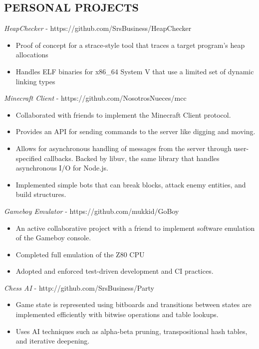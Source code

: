 \documentclass[overlapped, 10pt]{res} %
\begin{document}
\begin{resume}

\section{PERSONAL PROJECTS}
{\sl HeapChecker} - https://github.com/SrsBusiness/HeapChecker
\begin{itemize} \itemsep -2pt %
    \item Proof of concept for a strace-style tool that traces a target program's heap allocations
    \item Handles ELF binaries for x86\_64 System V that use a limited set of dynamic linking types
\end{itemize}
{\sl Minecraft Client} - https://github.com/NosotrosNueces/mcc
\begin{itemize} \itemsep -2pt %
    \item Collaborated with friends to implement the Minecraft Client protocol.
    \item Provides an API for sending commands to the server like digging and moving.
    \item Allows for asynchronous handling of messages from the server through user-specified callbacks. Backed by libuv, the same library that handles asynchronous I/O for Node.js.
    \item Implemented simple bots that can break blocks, attack enemy entities, and build structures.
\end{itemize}
{\sl Gameboy Emulator} - https://github.com/mukkid/GoBoy
\begin{itemize} \itemsep -2pt %
    \item An active collaborative project with a friend to implement software emulation of the Gameboy console.
    \item Completed full emulation of the Z80 CPU
    \item Adopted and enforced test-driven development and CI practices.
\end{itemize}
{\sl Chess AI} - http://github.com/SrsBusiness/Party
\begin{itemize} \itemsep -2pt %
    \item Game state is represented using bitboards and transitions between states are implemented efficiently with bitwise operations and table lookups.
    \item Uses AI techniques such as alpha-beta pruning, transpositional hash tables, and iterative deepening.
\end{itemize}

\end{resume}
\end{document}
